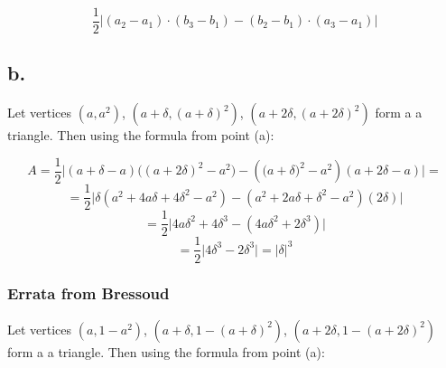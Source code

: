 \documentclass{article}
\begin{document}
\begin{equation*}
    \frac{1}{2} \Big| (a_{2} - a_{1}) \cdot (b_{3} - b_{1}) - (b_{2} - b_{1}) \cdot (a_{3} - a_{1})\Big|
\end{equation*}


\subsection*{b.}

Let vertices \((a, a^{2})\), \((a + \delta, (a + \delta)^{2})\), \((a + 2\delta, (a + 2\delta)^{2})\) form a
a triangle. Then using the formula from point (a):

\begin{equation*}
    A = \frac{1}{2}\Big|(a + \delta - a)\Big((a + 2\delta)^{2} - a^{2}\Big) - (\Big(a + \delta\Big)^{2} - a^{2})(a + 2\delta - a)\Big| =
\end{equation*}
\begin{equation*}
    = \frac{1}{2}\Big|\delta(a^{2} + 4a\delta + 4\delta^{2} - a^{2}) - (a^{2} + 2a\delta + \delta^{2} - a^{2})(2\delta)\Big|
\end{equation*}
\begin{equation*}
    = \frac{1}{2}\Big|4a\delta^{2} + 4\delta^{3} - (4a\delta^{2} + 2\delta^{3})\Big|
\end{equation*}
\begin{equation*}
    = \frac{1}{2}\Big|4\delta^{3} - 2\delta^{3}\Big| = \Big|\delta\Big|^{3}
\end{equation*}

\subsubsection*{Errata from Bressoud}

Let vertices \((a, 1 - a^{2})\), \((a + \delta, 1 - (a + \delta)^{2})\), \((a + 2\delta, 1 - (a + 2\delta)^{2})\) form a
a triangle. Then using the formula from point (a):
\end{document}
